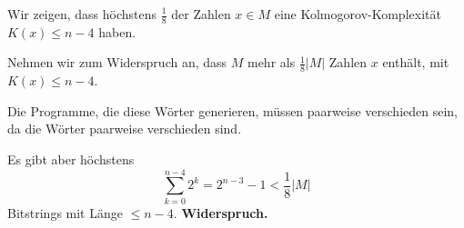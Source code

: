     Wir zeigen, dass höchstens $\frac{1}{8}$ der Zahlen $x \in M$ eine Kolmogorov-Komplexität $K(x) \leq n-4$ haben. 

    Nehmen wir zum Widerspruch an, dass $M$ mehr als $\frac{1}{8}|M|$ Zahlen $x$ enthält, mit $K(x) \leq n-4$. 

    Die Programme, die diese Wörter generieren, müssen paarweise verschieden sein, da die Wörter paarweise verschieden sind.

    Es gibt aber höchstens 
    $$\sum_{k=0}^{n-4}2^k = 2^{n-3} - 1 < \frac{1}{8}|M|$$
    Bitstrings mit Länge $\leq n-4$. \textbf{Widerspruch.}



    \vspace*{1cm}


